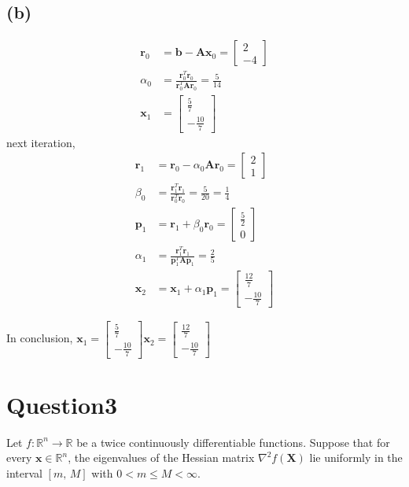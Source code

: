 \documentclass{article}
\newcommand{\R}{\mathbb{R}}
\begin{document}
\subsection*{(b)}
\begin{align*}
    \bm{r}_0 &= \bm{b} - \bm{A}\bm{x}_0 = \begin{bmatrix}
        2 \\
        -4
    \end{bmatrix} \\
    \alpha_0 &= \frac{\bm{r}_0^T\bm{r}_0}{\bm{r}_0^T \bm{A} \bm{r}_0} = \frac{5}{14} \\ 
    \bm{x}_1 &= \begin{bmatrix}
        \frac{5}{7} \\
        -\frac{10}{7}
    \end{bmatrix}
\end{align*}
next iteration,
\begin{align*}
    \bm{r}_1 &= \bm{r}_0 - \alpha_0 \bm{A} \bm{r}_0 = \begin{bmatrix}
        2 \\
        1
    \end{bmatrix} \\
    \beta_0 &= \frac{\bm{r}_1^T \bm{r}_1}{\bm{r}_0^T \bm{r}_0} = \frac{5}{20} = \frac{1}{4} \\
    \bm{p}_1 &= \bm{r}_1 + \beta_0\bm{r}_0 = \begin{bmatrix}
        \frac{5}{2} \\
        0
    \end{bmatrix}\ \\
    \alpha_1 &= \frac{\bm{r}_1^T\bm{r}_1}{\bm{p}_1^T \bm{A} \bm{p}_1} = \frac{2}{5} \\
    \bm{x}_2 &= \bm{x}_1 + \alpha_1 \bm{p}_1 = \begin{bmatrix}
        \frac{12}{7} \\
        -\frac{10}{7}
    \end{bmatrix}
\end{align*}

In conclusion, \(\bm{x}_1 = \begin{bmatrix}
    \frac{5}{7} \\
    -\frac{10}{7}
\end{bmatrix} \bm{x}_2 = \begin{bmatrix}
    \frac{12}{7} \\
    -\frac{10}{7}
\end{bmatrix}\)


\section*{Question3}
Let \(f: \R^n \to \R\) be a twice continuously differentiable functions. Suppose that for every \(\bm{x} \in \R^n\), the eigenvalues of the Hessian matrix \(\nabla^2 f(\bm{X})\) lie uniformly in the interval \([\textit{m, M}]\) with \(0 < m \leq M < \infty\).
\end{document}
